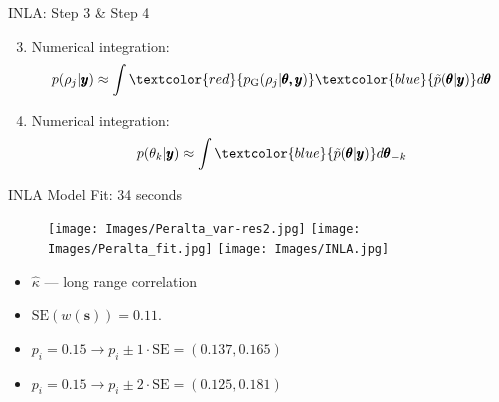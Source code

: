 \documentclass{beamer}
\begin{document}
\begin{frame}{INLA: Step 3 \& Step 4}{}
\begin{enumerate}
\setcounter{enumi}{2}
\item Numerical integration:
        $$ p(\rho_{j} | \pmb{y}) \approx \int \textcolor{red}{p_{\text{G}}(\rho_{j}|\pmb{\theta, y})} \textcolor{blue}{\tilde{p}(\pmb{\theta}|\pmb{y})} d\pmb{\theta} $$
\item Numerical integration:
$$ p(\theta_{k} | \pmb{y}) \approx \int \textcolor{blue}{\tilde{p}(\pmb{\theta}|\pmb{y})} d\pmb{\theta}_{-k} $$
\end{enumerate}
\end{frame}

\begin{frame}{INLA Model Fit: 34 seconds}{}
  \begin{figure}[H]
	\centering
	\texttt{[image: Images/Peralta\_var-res2.jpg]}
	\texttt{[image: Images/Peralta\_fit.jpg]}
	\texttt{[image: Images/INLA.jpg]}
	\end{figure}
\begin{table}
\end{table}
\begin{itemize}
\item $\hat{\kappa}$ --- long range correlation
\item $\text{SE}(w(\pmb{s})) = 0.11$.
\item $p_{i} = 0.15 \rightarrow p_{i} \pm 1 \cdot \text{SE} = (0.137, 0.165)$
\item $p_{i} = 0.15 \rightarrow p_{i} \pm 2 \cdot \text{SE} = (0.125, 0.181)$
\end{itemize}

\end{frame}
\end{document}
